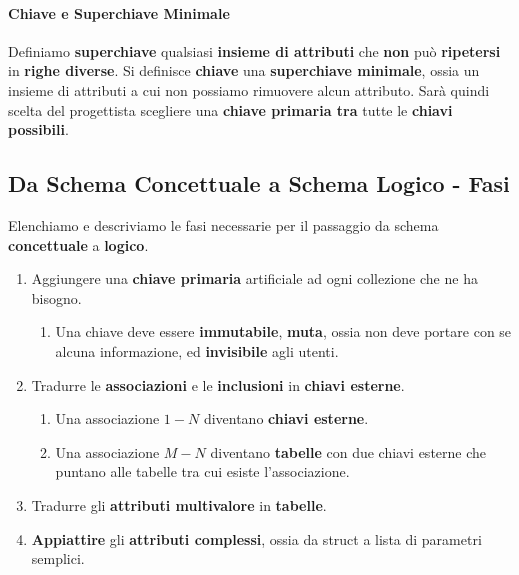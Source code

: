 \documentclass{article}
\begin{document}
\paragraph{Chiave e Superchiave Minimale} Definiamo \textbf{superchiave} qualsiasi \textbf{insieme di attributi} che \textbf{non} può \textbf{ripetersi} in \textbf{righe diverse}. Si definisce \textbf{chiave} una \textbf{superchiave minimale}, ossia un insieme di attributi a cui
non possiamo rimuovere alcun attributo. Sarà quindi scelta del progettista scegliere una \textbf{chiave primaria tra} tutte le \textbf{chiavi possibili}.

\subsection{Da Schema Concettuale a Schema Logico - Fasi}

Elenchiamo e descriviamo le fasi necessarie per il passaggio da schema \textbf{concettuale} a \textbf{logico}.

\begin{enumerate}
    \item Aggiungere una \textbf{chiave primaria} artificiale ad ogni collezione che ne ha bisogno.
    \begin{enumerate}
        \item Una chiave deve essere \textbf{immutabile}, \textbf{muta}, ossia non deve portare con se alcuna informazione, ed \textbf{invisibile} agli utenti.
    \end{enumerate}
    \item Tradurre le \textbf{associazioni} e le \textbf{inclusioni} in \textbf{chiavi esterne}.
    \begin{enumerate}
        \item Una associazione $1-N$ diventano \textbf{chiavi esterne}.
        \item Una associazione $M-N$ diventano \textbf{tabelle} con due chiavi esterne che puntano alle tabelle tra cui esiste l'associazione.
    \end{enumerate}
    \item Tradurre gli \textbf{attributi multivalore} in \textbf{tabelle}.
    \item \textbf{Appiattire} gli \textbf{attributi complessi}, ossia da struct a lista di parametri semplici.
\end{enumerate}


\newpage

\end{document}
